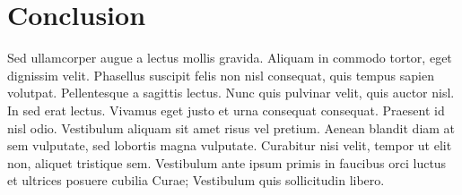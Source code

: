 \documentclass[10pt, conference]{IEEEtran}
\begin{document}
\section{Conclusion}
\label{sec:conclusion}

Sed ullamcorper augue a lectus mollis gravida. Aliquam in commodo tortor, eget dignissim velit. Phasellus suscipit felis non nisl consequat, quis tempus sapien volutpat. Pellentesque a sagittis lectus. Nunc quis pulvinar velit, quis auctor nisl. In sed erat lectus. Vivamus eget justo et urna consequat consequat. Praesent id nisl odio. Vestibulum aliquam sit amet risus vel pretium. Aenean blandit diam at sem vulputate, sed lobortis magna vulputate. Curabitur nisi velit, tempor ut elit non, aliquet tristique sem. Vestibulum ante ipsum primis in faucibus orci luctus et ultrices posuere cubilia Curae; Vestibulum quis sollicitudin libero.


\balance


\end{document}
